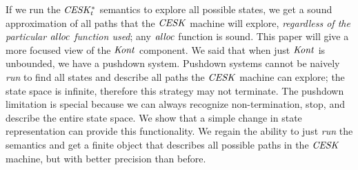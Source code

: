 If we run the $\mathit{CESK^*_t}$ semantics to explore all possible states, we get a sound approximation of all paths that the $\mathit{CESK}$ machine will explore, \emph{regardless of the particular $\mathit{alloc}$ function used}; any $\mathit{alloc}$ function is sound.
%
This paper will give a more focused view of the $\mathit{Kont}$ component.
%
We said that when just $\mathit{Kont}$ is unbounded, we have a pushdown system.
%
Pushdown systems cannot be naively \emph{run} to find all states and describe all paths the $\mathit{CESK}$ machine can explore; the state space is infinite, therefore this strategy may not terminate.
%
The pushdown limitation is special because we can always recognize non-termination, stop, and describe the entire state space.
%
We show that a simple change in state representation can provide this functionality.
%
We regain the ability to just \emph{run} the semantics and get a finite object that describes all possible paths in the $\mathit{CESK}$ machine, but with better precision than before.
